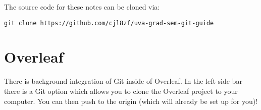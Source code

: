 \documentclass{article}
\begin{document}
The source code for these notes can be cloned via:
\begin{lstlisting}
git clone https://github.com/cjl8zf/uva-grad-sem-git-guide
\end{lstlisting}

\section{Overleaf}
There is background integration of Git inside of Overleaf. In the left
side bar there is a Git option which allows you to clone the Overleaf
project to your computer. You can then push to the origin (which will
already be set up for you)!
\end{document}
